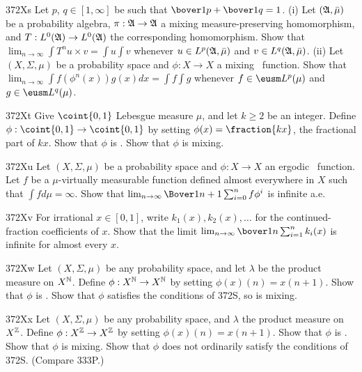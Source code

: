 {\spheader 372Xs Let $p$, $q\in [1,\infty]$ be such that
$\bover1p+\bover1q=1$.
(i) Let $(\frak A,\bar\mu)$ be a probability algebra,
$\pi:\frak A\to\frak A$ a mixing measure-preserving homomorphism, and
$T:L^0(\frak A)\to L^0(\frak A)$ the corresponding homomorphism.
Show that $\lim_{n\to\infty}\int T^nu\times v=\int u\int v$ whenever
$u\in L^p(\frak A,\bar\mu)$ and $v\in L^q(\frak A,\bar\mu)$.
(ii) Let $(X,\Sigma,\mu)$ be a probability space and
$\phi:X\to X$ a mixing \imp\ function.   Show that
$\lim_{n\to\infty}\int f(\phi^n(x))g(x)dx=\int f\int g$ whenever
$f\in\eusm L^p(\mu)$ and $g\in\eusm L^q(\mu)$.

\spheader 372Xt Give $\coint{0,1}$ Lebesgue measure $\mu$, and let
$k\ge 2$ be an integer.   Define $\phi:\coint{0,1}\to\coint{0,1}$ by
setting
$\phi(x)=\fraction{kx}$, the fractional part of $kx$.   Show that $\phi$
is \imp.    Show that $\phi$ is mixing.   

\spheader 372Xu Let $(X,\Sigma,\mu)$ be a probability space and
$\phi:X\to X$ an ergodic \imp\ function.   Let $f$ be a
$\mu$-virtually measurable function defined almost everywhere in $X$
such that $\int fd\mu=\infty$.   Show that
$\lim_{n\to\infty}\Bover1{n+1}\sum_{i=0}^nf\phi^i$ is infinite a.e.

\spheader 372Xv For irrational $x\in[0,1]$, write $k_1(x),k_2(x),\ldots$
for the continued-fraction coefficients of $x$.   Show that the limit
$\lim_{n\to\infty}\bover1n\sum_{i=1}^nk_i(x)$ is infinite
for almost every
$x$.   

\spheader 372Xw Let $(X,\Sigma,\mu)$ be any probability space, and let
$\lambda$ be the product measure on $X^{\Bbb N}$.   Define
$\phi:X^{\Bbb N}\to X^{\Bbb N}$ by setting $\phi(x)(n)=x(n+1)$.  Show
that $\phi$ is
\imp.   Show that $\phi$ satisfies the conditions of 372S, so is mixing.

\spheader 372Xx Let $(X,\Sigma,\mu)$ be any probability space, and
$\lambda$ the product measure on $X^{\Bbb Z}$.   Define
$\phi:X^{\Bbb Z}\to X^{\Bbb Z}$ by setting $\phi(x)(n)=x(n+1)$.  Show
that $\phi$ is
\imp.   Show that $\phi$ is mixing.      Show that $\phi$ does not
ordinarily satisfy the conditions of 372S.   (Compare 333P.)

}

